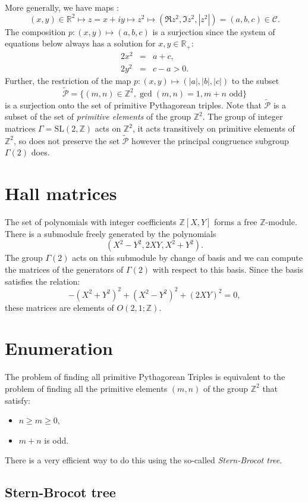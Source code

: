 \documentclass[12pt,a4paper]{amsart}
\def\g2{\Gamma(2)}
\def\ZZ{\mathbb{Z}}
\def\RR{\mathbb{R}}
\def\slz{\mathrm{SL}(2, \ZZ)}
\def\lc{\mathcal{C}}
\def\hp{\tilde{\mathcal{P}}}
\begin{document}
More generally,  we have maps : 
$$(x,y)\in \RR^2 \mapsto z = x + iy \mapsto z^2 \mapsto (\Re z^2, \Im z^2,
|z^2|) = (a,b,c) \in \lc .$$
The composition $p:(x,y) \mapsto (a,b,c)$ is a surjection 
since the system of equations below always has a solution
for $x,y \in \RR_+$:
\begin{eqnarray*}
2 x^2 &=& a + c, \\
2 y^2 &=&  c - a > 0.
\end{eqnarray*}
Further, the restriction of the map $p:(x,y) \mapsto (|a|,|b|,|c|)$
to the subset
$$\hp = \{(m,n) \in \ZZ^2, \gcd(m,n) = 1,  m+n \text{ odd}\}$$
is  a surjection onto the set of primitive Pythagorean triples.
Note that $\hp$ is a subset of the set of
\textit{primitive elements} of the group $\ZZ^2$.
The group of  integer
matrices $\Gamma = \slz$ acts on $\ZZ^2$,
it acts transitively on primitive elements of $\ZZ^2$,
so does not preserve the set $\hp$
however the principal congruence subgroup $\g2$ does.


\section{Hall matrices}


The set of polynomials with integer coefficients $\ZZ[X,Y]$ forms a free $\ZZ$-module.
There is a submodule freely generated by the polynomials
$$(X^2 - Y^2, 2XY, X^2 + Y^2).$$
The group $\Gamma(2)$ acts on this submodule by change of basis and we can
compute the matrices of the generators of $\Gamma(2)$ with respect
to this basis.
Since the basis satisfies the relation:
$$-(X^2 + Y^2)^2 +  (X^2-Y^2)^2 + (2XY)^2 = 0,$$
these matrices are elements of $O(2,1;\ZZ)$.


\section{Enumeration}

The problem of finding all primitive Pythagorean Triples
is equivalent to the problem of finding all the primitive elements
$(m,n)$ of the group $\ZZ^2$ 
that satisfy:
\begin{itemize}
	\item $n \geq m \geq 0$,
	\item $m+n$ is odd.
\end{itemize}
There is a very efficient way to do this using the so-called \textit{Stern-Brocot tree}. 

\subsection{Stern-Brocot tree}
\end{document}
